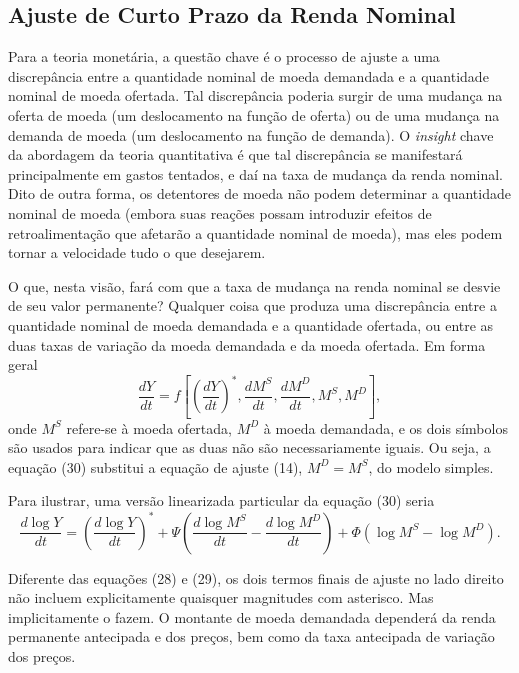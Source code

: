 \documentclass[12pt]{article}
\begin{document}
\subsection{Ajuste de Curto Prazo da Renda Nominal}

Para a teoria monetária, a questão chave é o processo de ajuste a uma discrepância entre a quantidade nominal de moeda demandada e a quantidade nominal de moeda ofertada. Tal discrepância poderia surgir de uma mudança na oferta de moeda (um deslocamento na função de oferta) ou de uma mudança na demanda de moeda (um deslocamento na função de demanda). O \textit{insight} chave da abordagem da teoria quantitativa é que tal discrepância se manifestará principalmente em gastos tentados, e daí na taxa de mudança da renda nominal. Dito de outra forma, os detentores de moeda não podem determinar a quantidade nominal de moeda (embora suas reações possam introduzir efeitos de retroalimentação que afetarão a quantidade nominal de moeda), mas eles podem tornar a velocidade tudo o que desejarem.

O que, nesta visão, fará com que a taxa de mudança na renda nominal se desvie de seu valor permanente? Qualquer coisa que produza uma discrepância entre a quantidade nominal de moeda demandada e a quantidade ofertada, ou entre as duas taxas de variação da moeda demandada e da moeda ofertada. Em forma geral
\begin{equation}
\frac{dY}{dt} = f\left[ \left(\frac{dY}{dt}\right)^*, \frac{dM^S}{dt}, \frac{dM^D}{dt}, M^S, M^D \right],
\end{equation}
onde $M^S$ refere-se à moeda ofertada, $M^D$ à moeda demandada, e os dois símbolos são usados para indicar que as duas não são necessariamente iguais. Ou seja, a equação (30) substitui a equação de ajuste (14), $M^D = M^S$, do modelo simples.

Para ilustrar, uma versão linearizada particular da equação (30) seria
\begin{equation}
\frac{d \log Y}{dt} = \left( \frac{d \log Y}{dt} \right)^* + \Psi \left( \frac{d \log M^S}{dt} - \frac{d \log M^D}{dt} \right) + \Phi (\log M^S - \log M^D).
\end{equation}

Diferente das equações (28) e (29), os dois termos finais de ajuste no lado direito não incluem explicitamente quaisquer magnitudes com asterisco. Mas implicitamente o fazem. O montante de moeda demandada dependerá da renda permanente antecipada e dos preços, bem como da taxa antecipada de variação dos preços.
\end{document}
